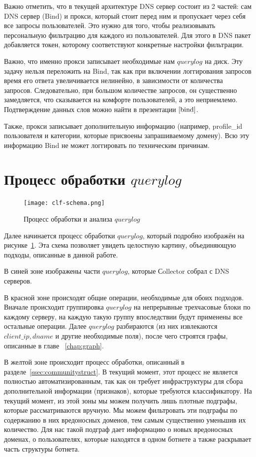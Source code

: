 \documentclass[a4paper,14pt]{extreport} %
\begin{document}
Важно отметить, что в текущей архитектуре DNS сервер состоит из 2 частей: сам DNS сервер (Bind) и прокси, который стоит перед ним и пропускает через себя все запросы пользователей. Это нужно для того, чтобы реализовывать персональную фильтрацию для каждого из пользователей. Для этого в DNS пакет добавляется токен, которому соответствуют конкретные настройки фильтрации. 

Важно, что именно прокси записывает необходимые нам $querylog$ на диск. Эту задачу нельзя переложить на Bind, так как при включении логгирования запросов время его ответа увеличивается нелинейно, в зависимости от количества запросов. Следовательно, при большом количестве запросов, он существенно замедляется, что сказывается на комфорте пользователей, а это неприемлемо. Подтверждение данных слов можно найти в презентации  $\cite{bind}$.

Также, прокси записывает дополнительную информацию (например, profile\_id пользователя и категории, которые присвоены запрашиваемому домену). Всю эту информацию Bind не может логгировать по техническим причинам.

\section{Процесс обработки $querylog$}
\begin{figure}[H]
	\center
	\texttt{[image: clf-schema.png]}
	\caption{Процесс обработки и анализа $querylog$}
			
	\label{fig:full-proc}
\end{figure}

Далее начинается процесс обработки $querylog$, который подробно изображён на  рисунке~\ref{fig:full-proc}. Эта схема позволяет увидеть целостную картину, объединяющую подходы, описанные в данной работе.


В синей зоне изображены части $querylog$, которые Сollector собрал с DNS серверов.

В красной зоне происходят общие операции, необходимые для обоих подходов. Вначале происходит группировка $querylog$ на непрерывные трехчасовые блоки по каждому серверу, на каждую такую группу впоследствии будут применены все остальные операции. Далее $querylog$ разбираются (из них извлекаются $client\_ip, dname$ и другие необходимые поля), после чего строятся графы, описанные в главе ~\ref{chap:graph}. 

В желтой зоне происходит процесс обработки, описанный в разделе~\ref{ssec:communitystruct}. В текущий момент, этот процесс не является полностью автоматизированным, так как он требует инфраструктуры для сбора дополнительной информации (признаков), которые требуются классификатору. На текущий момент, из этой зоны мы можем получить лишь плотные подграфы, которые рассматриваются вручную. Мы можем фильтровать эти подграфы по содержанию в них вредоносных доменов, тем самым существенно уменьшив их количество. Для нас такой подграф дает информацию о новых вредоносных доменах, о пользователях, которые находятся в одном ботнете а также раскрывает часть структуры ботнета.
\end{document}
